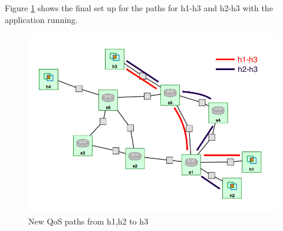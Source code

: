 \documentclass[paper=a4, fontsize=12pt]{scrartcl}	%
\numberwithin{equation}{section}		%
\numberwithin{figure}{section}			%
\numberwithin{table}{section}				%
\begin{document}
Figure \ref{Fig 5.4} shows the final set up for the paths for h1-h3 and h2-h3 with the application running.
\begin{figure}[H]
\begin{center}
\includegraphics[scale=0.45]{qos.png}   
\end{center}
 \caption{New QoS paths from h1,h2 to h3}
 \label{Fig 5.4}
\end{figure}
\end{document}
